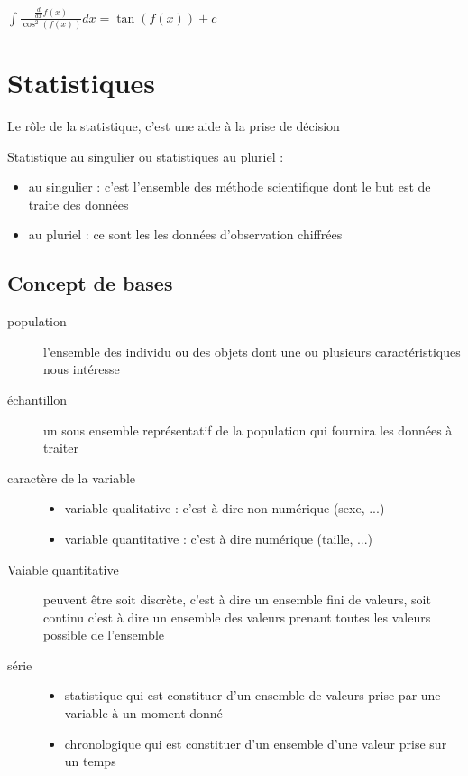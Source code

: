 \documentclass[a4paper,12pt]{article}
\begin{document}
$\int{\frac{\frac{d}{dx} f(x)}{\cos^2(f(x))}  dx} = \tan(f(x))+c$

\newpage
\section{Statistiques}

Le rôle de la statistique, c'est une aide à la prise de décision

Statistique au singulier ou statistiques au pluriel : 
\begin{itemize}%
    \item au singulier : c'est l'ensemble des méthode scientifique dont le but est de traite des données 
    \item au pluriel : ce sont les les données d'observation chiffrées 
\end{itemize}

\subsection{Concept de bases}
\begin{description}%
   \item[population] l'ensemble des individu ou des objets dont une ou plusieurs caractéristiques nous intéresse 
   \item[échantillon] un sous ensemble représentatif de la population qui fournira les données à traiter
   \item[caractère de la variable] 
        \begin{itemize}%
            \item variable qualitative : c'est à dire non numérique (sexe, ...)
            \item variable quantitative : c'est à dire numérique (taille, ...)
        \end{itemize}
   \item[Vaiable quantitative] peuvent être soit discrète, c'est à dire un ensemble fini de valeurs, soit continu c'est à dire un ensemble des valeurs prenant toutes les valeurs possible de l'ensemble
   \item[série] 
        \begin{itemize}%
            \item statistique qui est constituer d'un ensemble de valeurs prise par une variable à un moment donné
            \item  chronologique qui est constituer d'un ensemble d'une valeur prise sur un temps
        \end{itemize}
\end{description}
\end{document}
